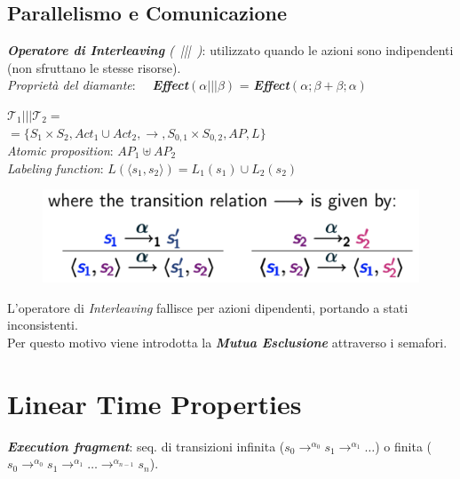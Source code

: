 \documentclass[a4paper, notitlepage, 9pt]{extreport}
\begin{document}
\section*{Parallelismo e Comunicazione}
\textit{\textbf{Operatore di Interleaving} (~|||~)}: utilizzato quando le azioni sono indipendenti (non sfruttano le stesse risorse).\\
\textit{Proprietà del diamante}: ~~\textit{\textbf{Effect}}$(\alpha ||| \beta)$ = \textit{\textbf{Effect}}$(\alpha; \beta + \beta; \alpha)$
\begin{multicols}{2}
	\noindent
	$\mathcal{T}_1 ||| \mathcal{T}_2 = $\\
	$= \{S_1 \times S_2, Act_1 \cup Act_2, \longrightarrow, S_{0, 1} \times S_{0, 2}, AP, L \}$\\
	\textit{Atomic proposition}: $AP_1 \uplus AP_2$\\
	\textit{Labeling function}: $L(\langle s_1, s_2 \rangle) = L_1(s_1)\cup L_2(s_2)$
	\columnbreak
	\begin{figure}[H]
		\centering
		\includegraphics[scale=0.35]{T1T2}
	\end{figure}
\end{multicols}
\noindent
L'operatore di \textit{Interleaving} fallisce per azioni dipendenti, portando a stati inconsistenti.\\
Per questo motivo viene introdotta la \textit{\textbf{Mutua Esclusione}} attraverso i semafori.



\chapter*{Linear Time Properties}
\textit{\textbf{Execution fragment}}: seq. di transizioni infinita ($s_0 \rightarrow^{\alpha_0} s_1 \rightarrow^{\alpha_1} \dots$) o finita ($s_0 \rightarrow^{\alpha_0} s_1 \rightarrow^{\alpha_1} \dots \rightarrow^{\alpha_{n-1}} s_n$).
\end{document}
